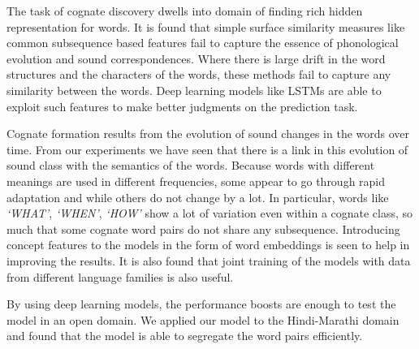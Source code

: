 \documentclass[11pt,letterpaper]{article}
\begin{document}
The task of cognate discovery dwells into domain of finding rich hidden representation for words. It is found that simple surface similarity measures like common subsequence based features fail to capture the essence of phonological evolution and sound correspondences. Where there is large drift in the word structures and the characters of the words, these methods fail to capture any similarity between the words. Deep learning models like LSTMs are able to exploit such features to make better judgments on the prediction task. 

Cognate formation results from the evolution of sound changes in the words over time. From our experiments we have seen that there is a link in this evolution of sound class with the semantics of the words. Because words with different meanings are used in different frequencies, some appear to go through rapid adaptation and while others do not change by a lot. In particular, words like \textit{`WHAT'}, \textit{`WHEN'}, \textit{`HOW'} show a lot of variation even within a cognate class, so much that some cognate word pairs do not share any subsequence. Introducing concept features to the models in the form of word embeddings is seen to help in improving the results. It is also found that joint training of the models with data from different language families is also useful.

By using deep learning models, the performance boosts are enough to test the model in an open domain. We applied our model to the Hindi-Marathi domain and found that the model is able to segregate the word pairs efficiently. 



\end{document}
